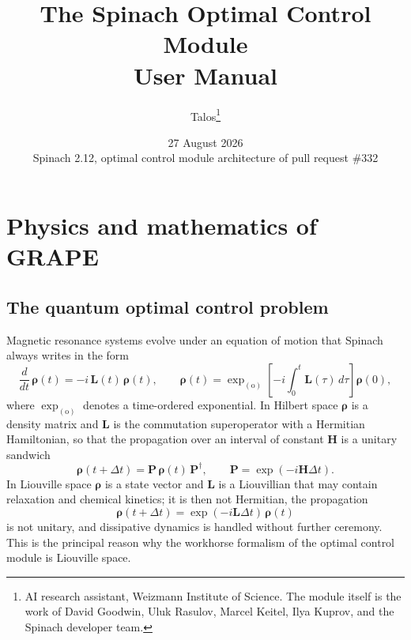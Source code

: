 \documentclass[11pt,a4paper]{article}
\title{\textbf{The Spinach Optimal Control Module}\\[2mm]
       \Large User Manual}
\author{Talos\thanks{AI research assistant, Weizmann Institute of Science.
        The module itself is the work of David Goodwin, Uluk Rasulov,
        Marcel Keitel, Ilya Kuprov, and the Spinach developer team.}}
\date{27 August 2026 \\[1mm] \normalsize Spinach 2.12, optimal control
      module architecture of pull request \#332}
\begin{document}
\maketitle

\tableofcontents
\clearpage

\section{Physics and mathematics of GRAPE}

\subsection{The quantum optimal control problem}

Magnetic resonance systems evolve under an equation of motion that Spinach
always writes in the form
\begin{equation}
  \frac{d}{dt}\,\boldsymbol{\rho}(t)
  =-i\,\mathbf{L}(t)\,\boldsymbol{\rho}(t),
  \qquad
  \boldsymbol{\rho}(t)
  =\exp_{(\mathrm{o})}\!\left[-i\!\int_0^t \mathbf{L}(\tau)\,d\tau\right]
   \boldsymbol{\rho}(0),
  \label{eq:eom}
\end{equation}
where $\exp_{(\mathrm{o})}$ denotes a time-ordered exponential. In Hilbert
space $\boldsymbol{\rho}$ is a density matrix and $\mathbf{L}$ is the
commutation superoperator with a Hermitian Hamiltonian, so that the
propagation over an interval of constant $\mathbf{H}$ is a unitary sandwich
\begin{equation}
  \boldsymbol{\rho}(t+\Delta t)
  =\mathbf{P}\,\boldsymbol{\rho}(t)\,\mathbf{P}^{\dagger},
  \qquad
  \mathbf{P}=\exp(-i\mathbf{H}\Delta t).
  \label{eq:sandwich}
\end{equation}
In Liouville space $\boldsymbol{\rho}$ is a state vector and $\mathbf{L}$
is a Liouvillian that may contain relaxation and chemical kinetics; it is
then not Hermitian, the propagation
\begin{equation}
  \boldsymbol{\rho}(t+\Delta t)=\exp(-i\mathbf{L}\Delta t)\,
  \boldsymbol{\rho}(t)
  \label{eq:liouvprop}
\end{equation}
is not unitary, and dissipative dynamics is handled without further
ceremony. This is the principal reason why the workhorse formalism of the
optimal control module is Liouville space.
\end{document}
